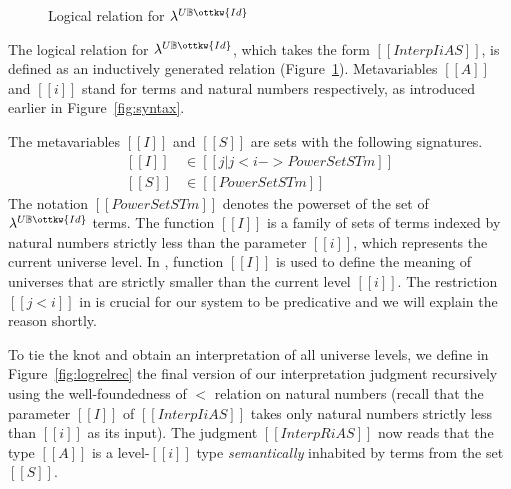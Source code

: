 \documentclass[acmsmall,screen=true,
\ifpublic review=false\else,review=true\fi
  ,anonymous=\ifanonymous true\else false\fi]{acmart}
\newcommand{\lang}{$\lambda^{U\mathbb{B}\ottkw{Id}}$\xspace}
\newcommand{\scw}[1]{}
\newcommand{\yl}[1]{}
\begin{document}
\label{sec:logreldep}
\begin{figure}[h]
\caption{Logical relation for \lang}
\label{fig:logrel}
\end{figure}
The logical relation for \lang{}, which takes the form $[[Interp I i A
S]]$, is defined as an inductively generated relation (Figure~\ref{fig:logrel}).
Metavariables $[[A]]$ and $[[i]]$ stand for terms and natural
numbers respectively, as introduced earlier in
Figure~\ref{fig:syntax}.
\scw{Is it worth observing here that this definition is not over sets of typed
terms. That it characterizes all terms that look like booleans (i.e. evaluate to
true or false) or all terms that look like proofs (i.e. evaluate to refl). The
fact that there is no connection between p and a and b in the I-Eq case is strange
looking. Need to explain.  }
The metavariables $[[I]]$ and $[[S]]$ are
sets with the following signatures.
\begin{equation*}
  \begin{split}
    [[I]] &\in [[ { j | j < i  } ->  PowerSet STm ]] \\
    [[S]] &\in [[PowerSet STm]]
  \end{split}
\end{equation*}
The notation $[[PowerSet STm]]$ denotes the powerset of the set of
\lang{} terms.
The function $[[I]]$ is a family of sets of terms indexed by
natural numbers strictly less than the parameter $[[i]]$, which
represents the current universe level.  In , function
$[[I]]$ is used to define the meaning of
universes that are strictly smaller than the current level $[[i]]$. The
restriction $[[j < i]]$ in  is crucial for our system to
be predicative and we will explain the reason shortly.

To tie the knot and obtain an interpretation of all universe levels,
we define in Figure~\ref{fig:logrelrec} the final version of our interpretation judgment recursively
using the well-foundedness of $<$ relation on natural
numbers (recall that
the parameter $[[I]]$ of $[[Interp I i A S]]$ takes only natural
numbers strictly less than $[[i]]$ as its input).
The judgment $[[InterpR i A S]]$ now reads that the type $[[A]]$ is a
level-$[[i]]$ type \emph{semantically} inhabited by terms from the set
$[[S]]$.
\end{document}
